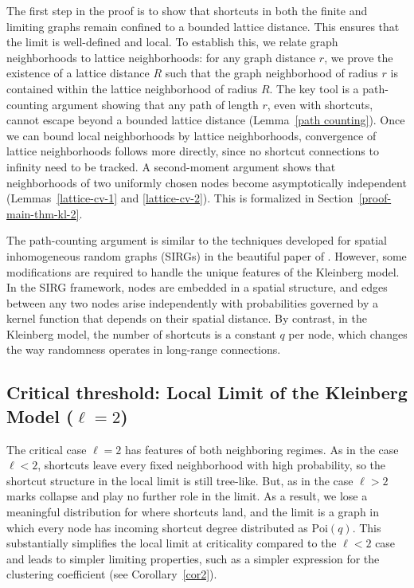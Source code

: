 \documentclass[10pt]{amsart}
\begin{document}
The first step in the proof is to show that shortcuts in both the finite and limiting graphs remain confined to a bounded lattice distance. 
This ensures that the limit is well-defined and local. 
To establish this, we relate graph neighborhoods to lattice neighborhoods:  for any graph distance \(r\), we prove the existence of a lattice distance \(R\) such that the graph neighborhood of radius \(r\) is contained within the lattice neighborhood of radius \(R\). The key tool is a path-counting argument showing that any path of length $r$, even with shortcuts, cannot escape beyond a bounded lattice distance (Lemma~\ref{path counting}). 
Once we can bound local neighborhoods by lattice neighborhoods, convergence of lattice neighborhoods follows more directly, since no shortcut connections to infinity need to be tracked. 
A second-moment argument shows that neighborhoods of two uniformly chosen nodes become asymptotically independent (Lemmas~\ref{lattice-cv-1} and \ref{lattice-cv-2}).  This is formalized in Section~\ref{proof-main-thm-kl-2}.

The path-counting argument is similar to the techniques developed for spatial inhomogeneous random graphs (SIRGs) in the beautiful paper of \cite{van2021local}. However, some modifications are required to handle the unique features of the Kleinberg model. In the SIRG framework, nodes are embedded in a spatial structure, and edges between any two nodes arise independently with probabilities governed by a kernel function that depends on their spatial distance. By contrast, in the Kleinberg model, the number of shortcuts is a constant  $q$ per node, which changes the way randomness operates in long-range connections.



\subsection{Critical threshold: Local Limit of the Kleinberg Model ($\ell = 2$)} \label{local-limit-kl-critical}

The critical case $\ell=2$ has features of both neighboring regimes.
As in the case $\ell<2$, shortcuts leave every fixed neighborhood with
high probability, so the shortcut structure in the local limit is still
tree-like. But, as in the case $\ell>2$ marks collapse and play no further role in the limit. 
As a result, we lose a meaningful distribution for where shortcuts land, and the limit is a graph in which every node has incoming shortcut degree distributed as $\text{Poi}(q)$. This substantially simplifies the local limit at criticality compared to the $\ell<2$ case and leads to simpler limiting properties, such as a simpler expression for the clustering coefficient (see Corollary~\ref{cor2}). 
\end{document}
